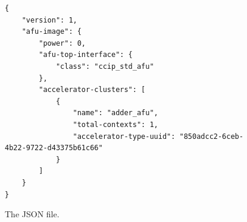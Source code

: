 \documentclass[11pt, twoside, pdftex]{article}
\begin{document}
\lstset{language=Java,numbers=none,escapechar=|}
\begin{figure}[h]
\begin{center}
\begin{minipage}[h]{15 cm}
\begin{lstlisting}[name=json]
{
    "version": 1,
    "afu-image": {
        "power": 0,
        "afu-top-interface": {
            "class": "ccip_std_afu"
        },
        "accelerator-clusters": [
            {
                "name": "adder_afu",
                "total-contexts": 1,
                "accelerator-type-uuid": "850adcc2-6ceb-4b22-9722-d43375b61c66"
            }
        ]
    }
}
\end{lstlisting}
\end{minipage}
\vspace{-.5cm}
\caption{The JSON file.}
\label{fig:json}
\end{center}
\end{figure}
\end{document}
